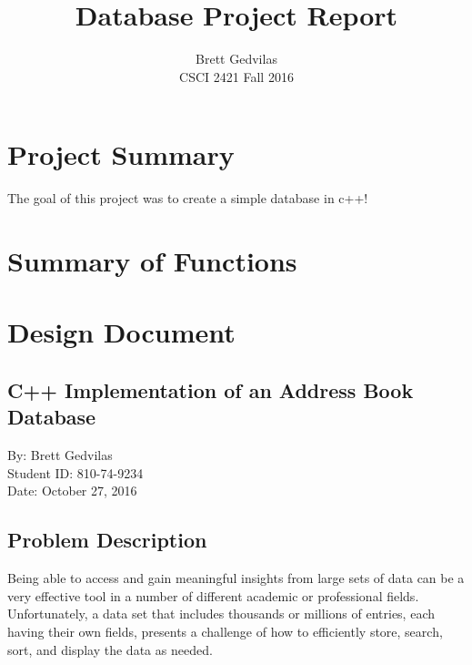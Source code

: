 \documentclass[11pt]{article}
\begin{document}
\title{Database Project Report}
\author{Brett Gedvilas\\CSCI 2421 Fall 2016}
\maketitle

\section*{Project Summary}

The goal of this project was to create a simple database in c++!

\newpage



\section*{Summary of Functions}


\newpage


\section*{Design Document}

\subsection*{C++ Implementation of an Address Book Database}
\begin{center}
\vspace{.5cm}
By: Brett Gedvilas\\
Student ID: 810-74-9234\\
Date: October 27, 2016\\
\end{center}

\subsection*{Problem Description}

	Being able to access and gain meaningful insights from large sets of data can be a very effective tool in a number of
different academic or professional fields. Unfortunately, a data set that includes thousands or millions of entries, each
having their own fields, presents a challenge of how to efficiently store, search, sort, and display the data as needed. 
\end{document}

